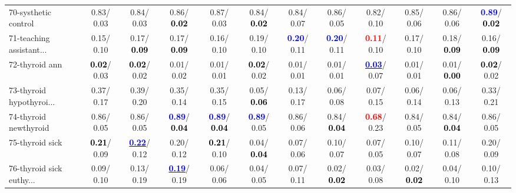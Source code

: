 \begin{table}[h]
\begin{center}
{\begin{tabular}{lc|c|c|c|c|c|c|c|c|c|c}
70-systhetic control &   0.83/  0.03 &   0.84/  0.03 &   0.86/\textcolor{black}{\textbf{  0.02}} &   0.87/  0.03 &   0.84/\textcolor{black}{\textbf{  0.02}} &   0.84/  0.07 &   0.86/  0.05 &   0.82/  0.10 &   0.85/  0.06 &   0.86/  0.06 & \textcolor{blue}{\textbf{  0.89}}/\textcolor{black}{\textbf{  0.02}} \\
71-teaching assistant... &   0.15/  0.10 &   0.17/\textcolor{black}{\textbf{  0.09}} &   0.17/\textcolor{black}{\textbf{  0.09}} &   0.16/  0.10 &   0.19/  0.10 & \textcolor{blue}{\textbf{  0.20}}/  0.11 & \textcolor{blue}{\textbf{  0.20}}/  0.11 & \textcolor{red}{\textbf{  0.11}}/  0.10 &   0.17/  0.10 &   0.18/\textcolor{black}{\textbf{  0.09}} &   0.16/\textcolor{black}{\textbf{  0.09}} \\ \hline
72-thyroid ann & \textcolor{black}{\textbf{  0.02}}/  0.03 & \textcolor{black}{\textbf{  0.02}}/  0.02 &   0.01/  0.02 &   0.01/  0.01 & \textcolor{black}{\textbf{  0.02}}/  0.02 &   0.01/  0.01 &   0.01/  0.01 & \underline{\textcolor{blue}{\textbf{  0.03}}}/  0.07 &   0.01/  0.01 &   0.01/\textcolor{black}{\textbf{  0.00}} & \textcolor{black}{\textbf{  0.02}}/  0.02 \\
73-thyroid hypothyroi... &   0.37/  0.17 &   0.39/  0.20 &   0.35/  0.14 &   0.35/  0.15 &   0.05/\textcolor{black}{\textbf{  0.06}} &   0.13/  0.17 &   0.06/  0.08 &   0.07/  0.15 &   0.06/  0.14 &   0.06/  0.13 &   0.33/  0.21 \\
74-thyroid newthyroid &   0.86/  0.05 &   0.86/  0.05 & \textcolor{blue}{\textbf{  0.89}}/\textcolor{black}{\textbf{  0.04}} & \textcolor{blue}{\textbf{  0.89}}/\textcolor{black}{\textbf{  0.04}} & \textcolor{blue}{\textbf{  0.89}}/  0.05 &   0.86/  0.06 &   0.84/\textcolor{black}{\textbf{  0.04}} & \textcolor{red}{\textbf{  0.68}}/  0.23 &   0.84/  0.05 &   0.84/\textcolor{black}{\textbf{  0.04}} &   0.86/  0.05 \\
75-thyroid sick & \textcolor{black}{\textbf{  0.21}}/  0.09 & \underline{\textcolor{blue}{\textbf{  0.22}}}/  0.12 &   0.20/  0.12 & \textcolor{black}{\textbf{  0.21}}/  0.10 &   0.04/\textcolor{black}{\textbf{  0.04}} &   0.07/  0.06 &   0.10/  0.07 &   0.07/  0.05 &   0.10/  0.07 &   0.11/  0.08 &   0.20/  0.09 \\
76-thyroid sick euthy... &   0.09/  0.10 &   0.13/  0.19 & \underline{\textcolor{blue}{\textbf{  0.19}}}/  0.19 &   0.06/  0.06 &   0.04/  0.05 &   0.07/  0.11 &   0.02/\textcolor{black}{\textbf{  0.02}} &   0.03/  0.08 &   0.02/\textcolor{black}{\textbf{  0.02}} &   0.04/  0.10 &   0.10/  0.13 \\

\end{tabular}}
\end{center}
\end{table}
